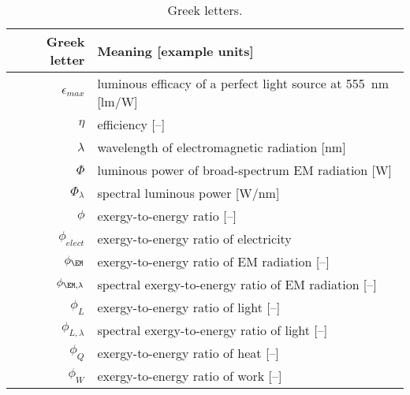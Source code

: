 \begin{table}
\centering %
\caption{Greek letters.}
\begin{tabular}{r l}
  \toprule
  Greek letter & Meaning [example units] \\
  \midrule
  $\epsilon_{max}$ & luminous efficacy of a perfect light source at 555~nm [lm/W] \\
  $\eta$ & efficiency [--] \\
  $\lambda$ & wavelength of electromagnetic radiation [nm] \\
  $\Phi$ & luminous power of broad-spectrum EM radiation [W] \\
  $\Phi_\lambda$ & spectral luminous power [W\!/\!nm] \\
  $\phi$ & exergy-to-energy ratio [--] \\
  $\phi_{elect}$ & exergy-to-energy ratio of electricity \\
  $\phi_{\EM}$ & exergy-to-energy ratio of EM radiation [--] \\
  $\phi_{\EM,\lambda}$ & spectral exergy-to-energy ratio of EM radiation [--] \\
  $\phi_{L}$ & exergy-to-energy ratio of light [--] \\
  $\phi_{L,\lambda}$ & spectral exergy-to-energy ratio of light [--] \\
  $\phi_Q$ & exergy-to-energy ratio of heat [--] \\
  $\phi_W$ & exergy-to-energy ratio of work [--] \\
  \bottomrule
\end{tabular}
\label{tab:greek}
\end{table}


  


  
